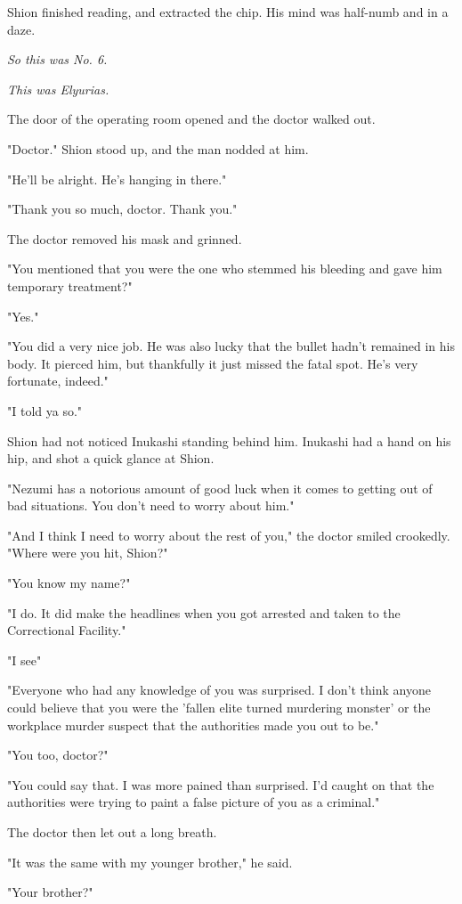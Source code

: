 Shion finished reading, and extracted the chip. His mind was half-numb
and in a daze.

\emph{So this was No. 6.}

\emph{This was Elyurias.}

The door of the operating room opened and the doctor walked out.

"Doctor." Shion stood up, and the man nodded at him.

"He'll be alright. He's hanging in there."

"Thank you so much, doctor. Thank you."

The doctor removed his mask and grinned.

"You mentioned that you were the one who stemmed his bleeding and gave
him temporary treatment?"

"Yes."

"You did a very nice job. He was also lucky that the bullet hadn't
remained in his body. It pierced him, but thankfully it just missed the
fatal spot. He's very fortunate, indeed."

"I told ya so."

Shion had not noticed Inukashi standing behind him. Inukashi had a hand
on his hip, and shot a quick glance at Shion.

"Nezumi has a notorious amount of good luck when it comes to getting out
of bad situations. You don't need to worry about him."

"And I think I need to worry about the rest of you," the doctor smiled
crookedly. "Where were you hit, Shion?"

"You know my name?"

"I do. It did make the headlines when you got arrested and taken to the
Correctional Facility."

"I see\el "

"Everyone who had any knowledge of you was surprised. I don't think
anyone could believe that you were the 'fallen elite turned murdering
monster' or the workplace murder suspect that the authorities made you
out to be."

"You too, doctor?"

"You could say that. I was more pained than surprised. I'd caught on
that the authorities were trying to paint a false picture of you as a
criminal."

The doctor then let out a long breath.

"It was the same with my younger brother," he said.

"Your brother?"

